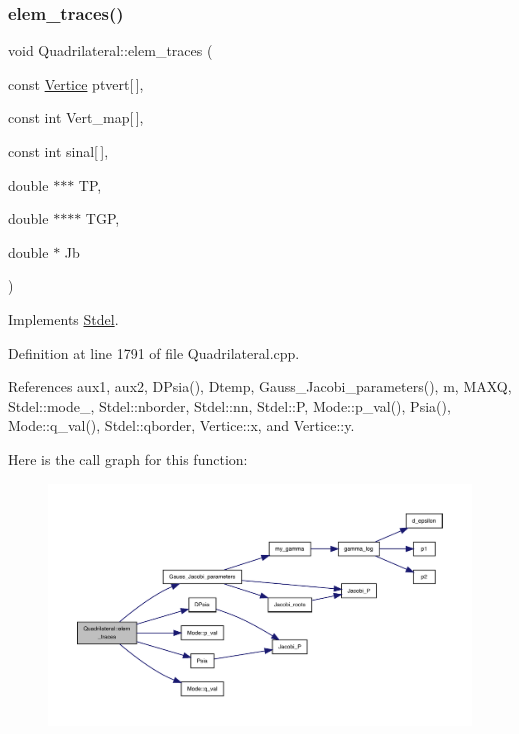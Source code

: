 \subsubsection{\texorpdfstring{elem\+\_\+traces()}{elem\_traces()}}
{\footnotesize\ttfamily void Quadrilateral\+::elem\+\_\+traces (\begin{DoxyParamCaption}\item[{const \hyperlink{structVertice}{Vertice}}]{ptvert\mbox{[}$\,$\mbox{]},  }\item[{const int}]{Vert\+\_\+map\mbox{[}$\,$\mbox{]},  }\item[{const int}]{sinal\mbox{[}$\,$\mbox{]},  }\item[{double $\ast$$\ast$$\ast$}]{TP,  }\item[{double $\ast$$\ast$$\ast$$\ast$}]{T\+GP,  }\item[{double $\ast$}]{Jb }\end{DoxyParamCaption})\hspace{0.3cm}{\ttfamily [virtual]}}



Implements \hyperlink{classStdel_a3d72869352a2ff5eeb23972eca3b391e}{Stdel}.



Definition at line 1791 of file Quadrilateral.\+cpp.



References aux1, aux2, D\+Psia(), Dtemp, Gauss\+\_\+\+Jacobi\+\_\+parameters(), m, M\+A\+XQ, Stdel\+::mode\+\_\+, Stdel\+::nborder, Stdel\+::nn, Stdel\+::P, Mode\+::p\+\_\+val(), Psia(), Mode\+::q\+\_\+val(), Stdel\+::qborder, Vertice\+::x, and Vertice\+::y.

Here is the call graph for this function\+:
\nopagebreak
\begin{figure}[H]
\begin{center}
\leavevmode
\includegraphics[width=350pt]{classQuadrilateral_a468bd309dfdd1efdb7e58eb795554f0d_cgraph}
\end{center}
\end{figure}
\mbox{\label{classQuadrilateral_a36182bade5a366259a236faa2061d8cb}} 
